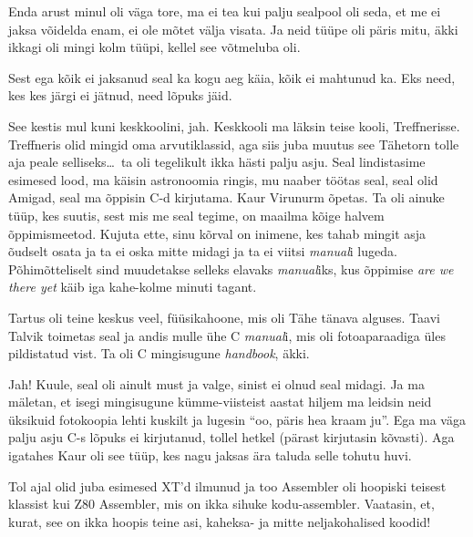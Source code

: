 
Enda arust minul oli väga tore, ma ei tea kui palju sealpool oli seda, et me ei 
jaksa võidelda enam, ei ole mõtet välja visata. Ja neid tüüpe oli päris mitu, 
äkki ikkagi oli mingi kolm tüüpi, kellel see võtmeluba  oli. 


Sest ega kõik ei jaksanud seal ka kogu aeg käia, kõik ei mahtunud ka. Eks need, 
kes  kes järgi ei jätnud, need lõpuks jäid. 


See kestis mul kuni keskkoolini, jah. Keskkooli ma läksin teise kooli, 
Treffnerisse. Treffneris olid  mingid 
oma arvutiklassid, aga siis juba  muutus see Tähetorn 
tolle aja peale selliseks\ldots\ ta oli tegelikult ikka hästi 
palju asju. Seal lindistasime  esimesed lood, ma käisin astronoomia 
ringis, mu naaber töötas seal, seal olid Amigad, seal ma õppisin 
C-d kirjutama. Kaur Virunurm õpetas. 
Ta oli ainuke tüüp, kes suutis, sest mis me seal tegime, on maailma kõige halvem 
õppimismeetod. Kujuta ette, sinu kõrval on inimene, kes tahab mingit asja 
õudselt osata ja ta ei oska mitte midagi ja ta ei viitsi \emph{manual}i 
lugeda. Põhimõtteliselt sind muudetakse selleks elavaks \emph{manual}iks, kus 
õppimise \emph{are we there yet} käib iga kahe-kolme minuti tagant.

Tartus oli teine keskus veel, füüsikahoone, mis oli Tähe tänava alguses. Taavi 
Talvik toimetas seal ja andis mulle ühe C 
\emph{manual}i, mis oli fotoaparaadiga üles pildistatud vist. Ta oli C 
mingisugune \emph{handbook}, äkki.


Jah! Kuule, seal oli ainult must ja valge, sinist ei olnud seal midagi. Ja ma 
mäletan, et  isegi mingisugune kümme-viisteist aastat hiljem ma leidsin neid 
üksikuid fotokoopia lehti kuskilt ja lugesin \enquote{oo, päris hea kraam ju}. 
Ega ma väga palju asju C-s lõpuks ei kirjutanud, tollel hetkel 
(pärast kirjutasin kõvasti). Aga igatahes Kaur oli 
see tüüp, kes nagu jaksas ära taluda selle tohutu huvi. 

Tol ajal olid juba esimesed XT'd ilmunud ja too 
Assembler oli hoopiski teisest klassist kui Z80 Assembler, 
mis on ikka sihuke kodu-assembler. Vaatasin, et, kurat, see on ikka hoopis 
teine asi, kaheksa- ja mitte neljakohalised koodid! 

